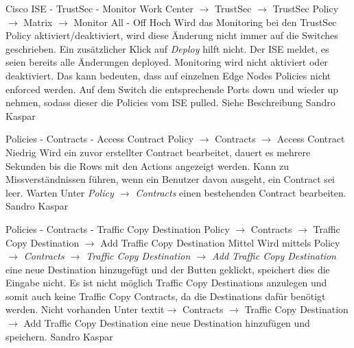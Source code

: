 \bugreport
{Cisco ISE - TrustSec - Monitor}
{Work Center $\rightarrow$ TrustSec $\rightarrow$ TrustSec Policy $\rightarrow$ Matrix $\rightarrow$ Monitor All - Off}
{Hoch}
{Wird das Monitoring bei den TrustSec Policy aktiviert/deaktiviert, wird diese Änderung nicht immer auf die Switches geschrieben. Ein zusätzlicher Klick auf \textit{Deploy} hilft nicht. Der ISE meldet, es seien bereits alle Änderungen deployed.}
{Monitoring wird nicht aktiviert oder deaktiviert. Das kann bedeuten, dass auf einzelnen Edge Nodes Policies nicht enforced werden.}
{Auf dem Switch die entsprechende Ports down und wieder up nehmen, sodass dieser die Policies vom ISE pulled.}
{
	Siehe Beschreibung
}
{Sandro Kaspar}
{}


\bugreport
{Policies - Contracts - Access Contract}
{Policy $\rightarrow$ Contracts $\rightarrow$ Access Contract}
{Niedrig}
{Wird ein zuvor erstellter Contract bearbeitet, dauert es mehrere Sekunden bis die Rows mit den Actions angezeigt werden.}
{Kann zu Missverständnissen führen, wenn ein Benutzer davon ausgeht, ein Contract sei leer.}
{Warten}
{Unter \textit{Policy $\rightarrow$ Contracts} einen bestehenden Contract bearbeiten.}
{Sandro Kaspar}
{}
	

\bugreport
{Policies - Contracts - Traffic Copy Destination}
{Policy $\rightarrow$ Contracts $\rightarrow$ Traffic Copy Destination $\rightarrow$ Add Traffic Copy Destination}
{Mittel}
{Wird mittels Policy \textit{$\rightarrow$ Contracts $\rightarrow$ Traffic Copy Destination $\rightarrow$ Add Traffic Copy Destination} eine neue Destination hinzugefügt und der  Butten geklickt, speichert dies die Eingabe nicht.}
{Es ist nicht möglich Traffic Copy Destinations anzulegen und somit auch keine Traffic Copy Contracts, da die Destinations dafür benötigt werden.}
{Nicht vorhanden}
{Unter textit{$\rightarrow$ Contracts $\rightarrow$ Traffic Copy Destination $\rightarrow$ Add Traffic Copy Destination} eine neue Destination hinzufügen und speichern.}
{Sandro Kaspar}
{}








